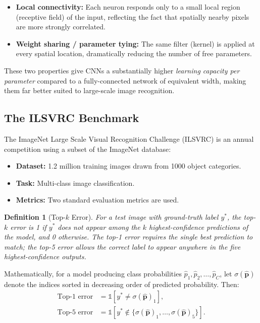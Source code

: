 \documentclass[12pt,a4paper]{article}
\newtheorem{definition}{Definition}[section]
\begin{document}
\begin{itemize}[leftmargin=2em]
  \item \textbf{Local connectivity:} Each neuron responds only to a small local region (receptive field) of the input, reflecting the fact that spatially nearby pixels are more strongly correlated.
  \item \textbf{Weight sharing / parameter tying:} The same filter (kernel) is applied at every spatial location, dramatically reducing the number of free parameters.
\end{itemize}

These two properties give CNNs a substantially higher \emph{learning capacity per parameter} compared to a fully-connected network of equivalent width, making them far better suited to large-scale image recognition.

\subsection{The ILSVRC Benchmark}

The ImageNet Large Scale Visual Recognition Challenge (ILSVRC) is an annual competition using a subset of the ImageNet database:
\begin{itemize}[leftmargin=2em]
  \item \textbf{Dataset:} 1.2 million training images drawn from 1000 object categories.
  \item \textbf{Task:} Multi-class image classification.
  \item \textbf{Metrics:} Two standard evaluation metrics are used.
\end{itemize}

\begin{definition}[Top-$k$ Error]
\label{def:topk}
For a test image with ground-truth label $y^*$, the \emph{top-$k$ error} is 1 if $y^*$ does not appear among the $k$ highest-confidence predictions of the model, and 0 otherwise. The top-1 error requires the single best prediction to match; the top-5 error allows the correct label to appear anywhere in the five highest-confidence outputs.
\end{definition}

Mathematically, for a model producing class probabilities $\hat{p}_1, \hat{p}_2, \ldots, \hat{p}_C$, let $\sigma(\hat{\mathbf{p}})$ denote the indices sorted in decreasing order of predicted probability. Then:
\begin{align}
  \text{Top-1 error} &= \mathbb{1}\!\left[y^* \neq \sigma(\hat{\mathbf{p}})_1\right], \\
  \text{Top-5 error} &= \mathbb{1}\!\left[y^* \notin \{\sigma(\hat{\mathbf{p}})_1,\ldots,\sigma(\hat{\mathbf{p}})_5\}\right].
\end{align}
\end{document}
